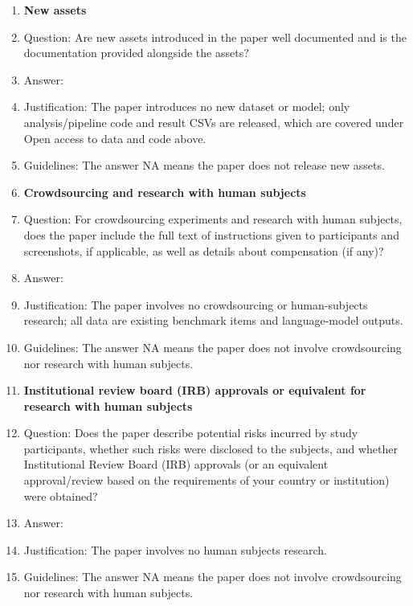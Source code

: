 \documentclass{article}
\begin{document}
\begin{enumerate}
\item {\bf New assets}
    \item[] Question: Are new assets introduced in the paper well documented and is the documentation provided alongside the assets?
    \item[] Answer: \answerNA{}
    \item[] Justification: The paper introduces no new dataset or model; only analysis/pipeline code and result CSVs are released, which are covered under Open access to data and code above.
    \item[] Guidelines: The answer NA means the paper does not release new assets.

\item {\bf Crowdsourcing and research with human subjects}
    \item[] Question: For crowdsourcing experiments and research with human subjects, does the paper include the full text of instructions given to participants and screenshots, if applicable, as well as details about compensation (if any)?
    \item[] Answer: \answerNA{}
    \item[] Justification: The paper involves no crowdsourcing or human-subjects research; all data are existing benchmark items and language-model outputs.
    \item[] Guidelines: The answer NA means the paper does not involve crowdsourcing nor research with human subjects.

\item {\bf Institutional review board (IRB) approvals or equivalent for research with human subjects}
    \item[] Question: Does the paper describe potential risks incurred by study participants, whether such risks were disclosed to the subjects, and whether Institutional Review Board (IRB) approvals (or an equivalent approval/review based on the requirements of your country or institution) were obtained?
    \item[] Answer: \answerNA{}
    \item[] Justification: The paper involves no human subjects research.
    \item[] Guidelines: The answer NA means the paper does not involve crowdsourcing nor research with human subjects.


\end{enumerate}
\end{document}

